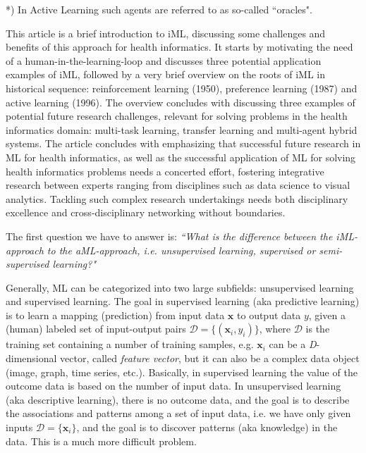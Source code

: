*) In Active Learning such agents are referred to as so-called ``oracles".

This article is a brief introduction to iML, discussing some challenges and benefits of this approach for health informatics. It starts by motivating the need of a human-in-the-learning-loop and discusses three potential application examples of iML, followed by a very brief overview on the roots of iML in historical sequence: reinforcement learning (1950), preference learning (1987) and active learning (1996). The overview concludes with discussing three examples of potential future research challenges, relevant for solving problems in the health informatics domain: multi-task learning, transfer learning and multi-agent hybrid systems. The article concludes with emphasizing that successful future research in ML for health informatics, as well as the successful application of ML for solving health informatics problems needs a concerted effort, fostering integrative research between experts ranging from disciplines such as data science to visual analytics. Tackling such complex research undertakings needs both disciplinary excellence and cross-disciplinary networking without boundaries.

The first question we have to answer is: \textit{``What is the difference between the iML-approach to the aML-approach, i.e. unsupervised learning, supervised or semi-supervised learning?"}

Generally, ML can be categorized into two large subfields: unsupervised learning and supervised learning. The goal in supervised learning (aka predictive learning) is to learn a mapping (prediction) from input data $\textbf{x}$ to output data $y$, given a (human) labeled set of input-output pairs $\mathcal{D}=\{(\textbf{x}_{i},y_i)\}$, where $\mathcal{D}$ is the training set containing a number of training samples, e.g. $\textbf{x}_{i}$ can be a \textit{D}-dimensional vector, called \textit{feature vector}, but it can also be a complex data object (image, graph, time series, etc.). Basically, in supervised learning the value of the outcome data is based on the number of input data.
In unsupervised learning (aka descriptive learning), there is no outcome data, and the goal is to describe the associations and patterns among a set of input data, i.e. we have only given inputs $\mathcal{D}=\{\textbf{x}_{i}\}$, and the goal is to discover patterns (aka knowledge) in the data. This is a much more difficult problem.\\



